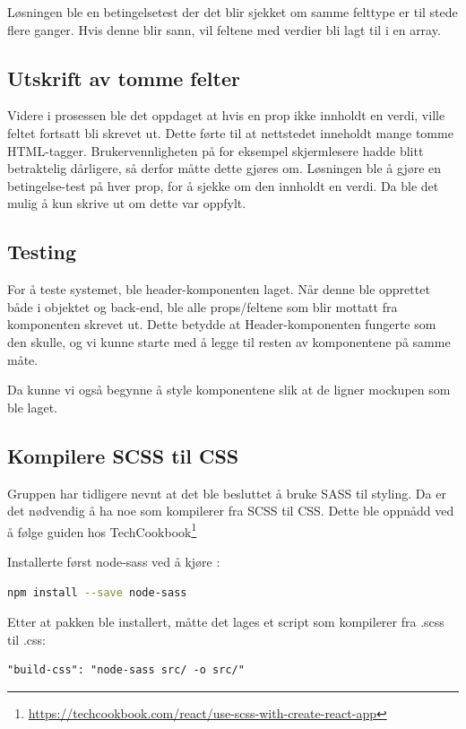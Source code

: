 Løsningen ble en betingelsetest der det blir sjekket om samme felttype er til stede flere ganger. Hvis denne blir sann, vil feltene med verdier bli lagt til i en array. 

\subsection{Utskrift av tomme felter}
Videre i prosessen ble det oppdaget at hvis en prop ikke innholdt en verdi, ville feltet fortsatt bli skrevet ut. Dette førte til at nettstedet inneholdt mange tomme HTML-tagger. Brukervennligheten på for eksempel skjermlesere hadde blitt betraktelig dårligere, så derfor måtte dette gjøres om. Løsningen ble å gjøre en betingelse-test på hver prop, for å sjekke om den innholdt en verdi. Da ble det mulig å kun skrive ut om dette var oppfylt.

\subsection{Testing}
For å teste systemet, ble header-komponenten laget. Når denne ble opprettet både i objektet og back-end, ble alle props/feltene som blir mottatt fra komponenten skrevet ut. Dette betydde at Header-komponenten fungerte som den skulle, og vi kunne starte med å legge til resten av komponentene på samme måte. 

Da kunne vi også begynne å style komponentene slik at de ligner mockupen som ble laget.

\subsection{Kompilere SCSS til CSS}
Gruppen har tidligere nevnt at det ble besluttet å bruke SASS til styling. Da er det nødvendig å ha noe som kompilerer fra SCSS til CSS. Dette ble oppnådd ved å følge guiden hos TechCookbook\footnote{\url{https://techcookbook.com/react/use-scss-with-create-react-app}}

Installerte først node-sass ved å kjøre :

\begin{lstlisting}[caption={Installering av node-sass},language=bash]
npm install --save node-sass
\end{lstlisting}

Etter at pakken ble installert, måtte det lages et script som kompilerer fra .scss til .css:

\begin{lstlisting}[caption={Kompliering fra .scss til .css}]
 "build-css": "node-sass src/ -o src/"
\end{lstlisting}
\clearpage

